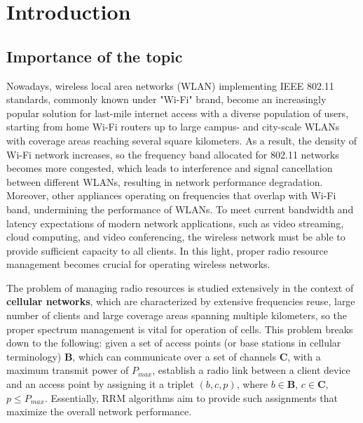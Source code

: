 \chapter{Introduction}
\label{chap:intro}
\chaptermark{}

\section{Importance of the topic}

Nowadays, wireless local area networks (WLAN) implementing IEEE 802.11 standards, commonly known under "Wi-Fi" brand, become an increasingly popular solution for last-mile internet access with a diverse population of users, starting from home Wi-Fi routers up to large campus- and city-scale WLANs with coverage areas reaching several square kilometers.
As a result, the density of Wi-Fi network increases, so the frequency band allocated for 802.11 networks becomes more congested, which leads to interference and signal cancellation between different WLANs, resulting in network performance degradation.
Moreover, other appliances operating on frequencies that overlap with Wi-Fi band, undermining the performance of WLANs.
To meet current bandwidth and latency expectations of modern network applications, such as video streaming, cloud computing, and video conferencing, the wireless network must be able to provide sufficient capacity to all clients. In this light, proper radio resource management becomes crucial for operating wireless networks.

The problem of managing radio resources is studied extensively in the context of \textbf{cellular networks}, which are characterized by extensive frequencies reuse, large number of clients and large coverage areas spanning multiple kilometers, so the proper spectrum management is vital for operation of cells. This problem breaks down to the following: given a set of access points (or base stations in cellular terminology) $\boldsymbol{B}$, which can communicate over a set of channels $\boldsymbol{C}$, with a maximum transmit power of $P_{max}$, establish a radio link between a client device and an access point by assigning it a triplet $(b, c, p)$, where $b \in \boldsymbol{B}$, $c \in \boldsymbol{C}$, $p \leq P_{max}$.
Essentially, RRM algorithms aim to provide such assignments that maximize the overall network performance.
